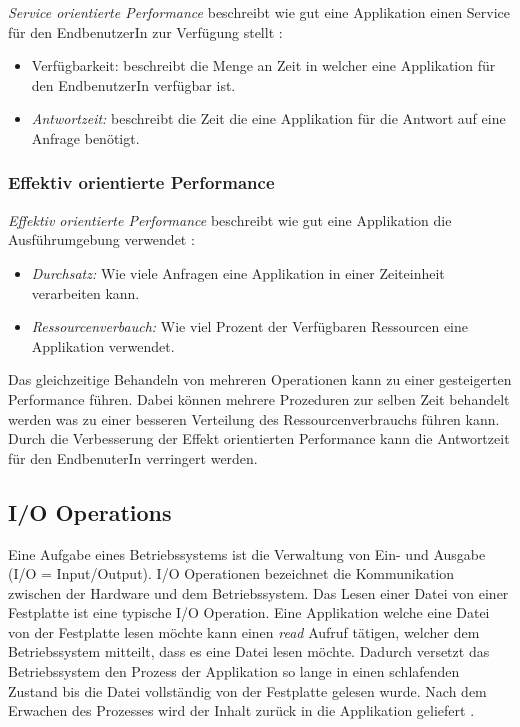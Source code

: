 \emph{Service orientierte Performance} beschreibt wie gut eine Applikation einen Service für den EndbenutzerIn zur Verfügung stellt \cite[p. 2]{Mol2009}:

\begin{itemize}
  \item {Verfügbarkeit:} beschreibt die Menge an Zeit in welcher eine Applikation für den EndbenutzerIn verfügbar ist.
  \item \emph{Antwortzeit:} beschreibt die Zeit die eine Applikation für die Antwort auf eine Anfrage benötigt.
\end{itemize}


\subsubsection{Effektiv orientierte Performance}

\emph{Effektiv orientierte Performance} beschreibt wie gut eine Applikation die Ausführumgebung verwendet \cite[p. 2]{Mol2009}:

\begin{itemize}
  \item \emph{Durchsatz:} Wie viele Anfragen eine Applikation in einer Zeiteinheit verarbeiten kann.
  \item \emph{Ressourcenverbauch:} Wie viel Prozent der Verfügbaren Ressourcen eine Applikation verwendet.
\end{itemize}

Das gleichzeitige Behandeln von mehreren Operationen kann zu einer gesteigerten Performance führen. Dabei können mehrere Prozeduren zur selben Zeit behandelt werden was zu einer besseren Verteilung des Ressourcenverbrauchs führen kann. Durch die Verbesserung der Effekt orientierten Performance kann die Antwortzeit für den EndbenuterIn verringert werden.

\subsection{I/O Operations}
\label{subsection: io_operationen}

Eine Aufgabe eines Betriebssystems ist die Verwaltung von Ein- und Ausgabe (I/O = Input/Output). I/O Operationen bezeichnet die Kommunikation zwischen der Hardware und dem Betriebssystem. Das Lesen einer Datei von einer Festplatte ist eine typische I/O Operation. Eine Applikation welche eine Datei von der Festplatte lesen möchte kann einen \emph{read} Aufruf tätigen, welcher dem Betriebssystem mitteilt, dass es eine Datei lesen möchte. Dadurch versetzt das Betriebssystem den Prozess der Applikation so lange in einen schlafenden Zustand bis die Datei vollständig von der Festplatte gelesen wurde. Nach dem Erwachen des Prozesses wird der Inhalt zurück in die Applikation geliefert \cite[p. 292]{tan09}.

